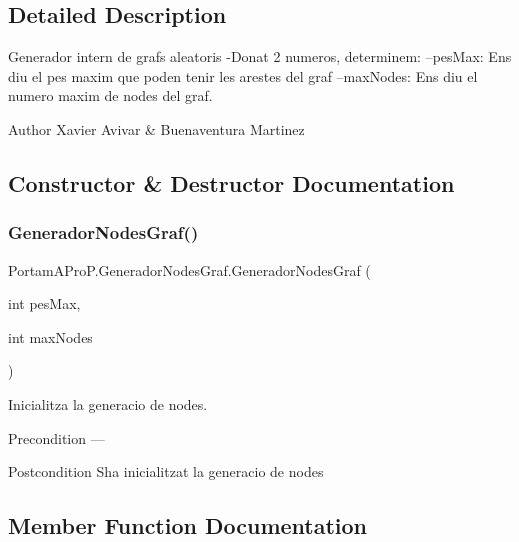 \subsection{Detailed Description}
Generador intern de grafs aleatoris -\/\+Donat 2 numeros, determinem\+: --pes\+Max\+: Ens diu el pes maxim que poden tenir les arestes del graf --max\+Nodes\+: Ens diu el numero maxim de nodes del graf. 

\begin{DoxyAuthor}{Author}
Xavier Avivar \& Buenaventura Martinez 
\end{DoxyAuthor}


\subsection{Constructor \& Destructor Documentation}
\mbox{\label{class_portam_a_pro_p_1_1_generador_nodes_graf_a0a254397d096732fe208ad9f70cf0a41}} 
\subsubsection{\texorpdfstring{Generador\+Nodes\+Graf()}{GeneradorNodesGraf()}}
{\footnotesize\ttfamily Portam\+A\+Pro\+P.\+Generador\+Nodes\+Graf.\+Generador\+Nodes\+Graf (\begin{DoxyParamCaption}\item[{int}]{pes\+Max,  }\item[{int}]{max\+Nodes }\end{DoxyParamCaption})}



Inicialitza la generacio de nodes. 

\begin{DoxyPrecond}{Precondition}
--- 
\end{DoxyPrecond}
\begin{DoxyPostcond}{Postcondition}
S\textquotesingle{}ha inicialitzat la generacio de nodes 
\end{DoxyPostcond}


\subsection{Member Function Documentation}
\mbox{\label{class_portam_a_pro_p_1_1_generador_nodes_graf_a426b43321777fd21fb46af7c63f27f07}} 

